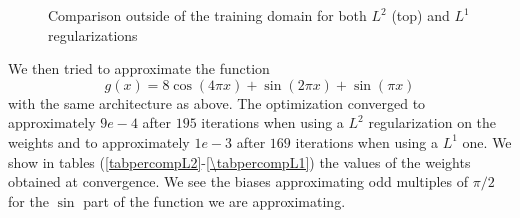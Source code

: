 \documentclass[11pt]{article}
\begin{document}
   \begin{figure}[!htb]
    \centering
    \caption{Comparison outside of the training domain for both $L^2$ (top) and $L^1$ regularizations}
    \label{fig:fourvsNN_outside}
\end{figure}


We then tried to approximate the function 
$$g(x) = 8 \cos(4\pi x) + \sin(2\pi x) + \sin(\pi x)$$ with the same architecture as above. The optimization converged to approximately $9e-4$ after $195$ iterations when using a $L^2$ regularization on the weights and to approximately $1e-3$ after $169$ iterations when using a $L^1$ one. We show in tables (\ref{tabpercompL2}-\ref{\tabpercompL1}) the values of the weights obtained at convergence. We see the biases approximating odd multiples of $\pi/2$ for the $\sin$ part of the function we are approximating. 
\end{document}
